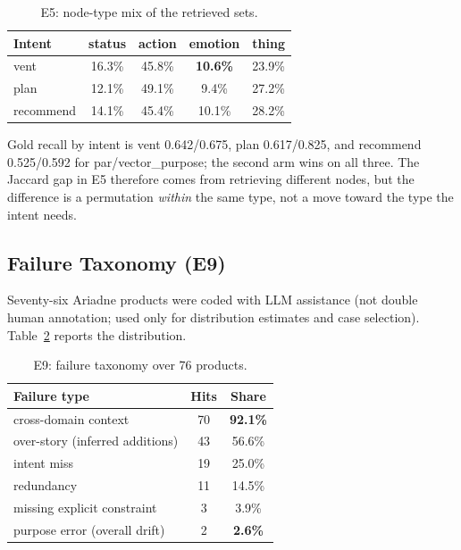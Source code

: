 \documentclass[11pt]{article}
\begin{document}
\begin{table}[t]
  \centering
  \small
  \begin{tabular}{@{}lcccc@{}}
    \toprule
    Intent & status & action & emotion & thing \\
    \midrule
    vent & 16.3\% & 45.8\% & \textbf{10.6\%} & 23.9\% \\
    plan & 12.1\% & 49.1\% & 9.4\% & 27.2\% \\
    recommend & 14.1\% & 45.4\% & 10.1\% & 28.2\% \\
    \bottomrule
  \end{tabular}
  \caption{E5: node-type mix of the retrieved sets.}\label{tab:e5types}
\end{table}

Gold recall by intent is vent 0.642/0.675, plan 0.617/0.825, and recommend 0.525/0.592 for
par/vector\_purpose; the second arm wins on all three. The Jaccard gap in E5 therefore comes from
retrieving different nodes, but the difference is a permutation \emph{within} the same type, not
a move toward the type the intent needs.

\subsection{Failure Taxonomy (E9)}
\label{sec:e9}

Seventy-six Ariadne products were coded with LLM assistance (not double human annotation; used
only for distribution estimates and case selection). Table~\ref{tab:e9} reports the distribution.

\begin{table}[t]
  \centering
  \small
  \begin{tabular}{@{}lcc@{}}
    \toprule
    Failure type & Hits & Share \\
    \midrule
    cross-domain context & 70 & \textbf{92.1\%} \\
    over-story (inferred additions) & 43 & 56.6\% \\
    intent miss & 19 & 25.0\% \\
    redundancy & 11 & 14.5\% \\
    missing explicit constraint & 3 & 3.9\% \\
    purpose error (overall drift) & 2 & \textbf{2.6\%} \\
    \bottomrule
  \end{tabular}
  \caption{E9: failure taxonomy over 76 products.}\label{tab:e9}
\end{table}
\end{document}
